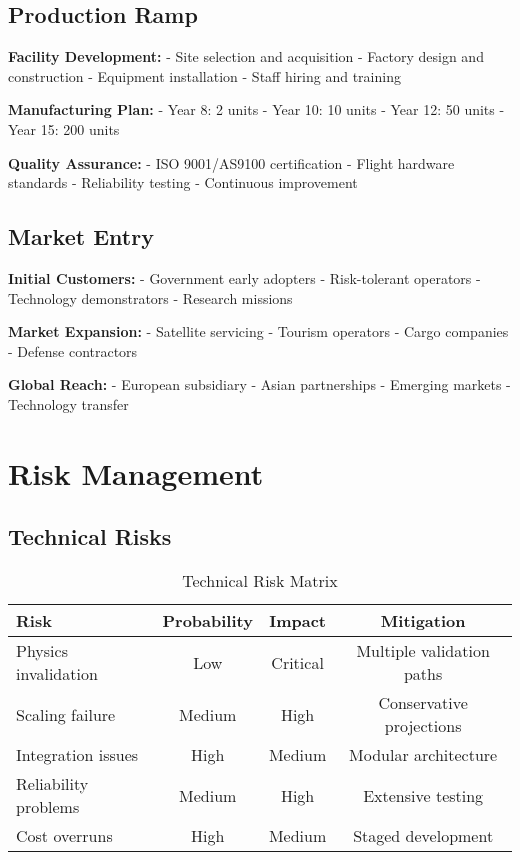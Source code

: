 \documentclass[12pt,letterpaper]{book}
\theoremstyle{definition}
\theoremstyle{plain}
\theoremstyle{remark}
\begin{document}
{{{{{\subsection{Production Ramp}

\textbf{Facility Development:}
- Site selection and acquisition
- Factory design and construction
- Equipment installation
- Staff hiring and training

\textbf{Manufacturing Plan:}
- Year 8: 2 units
- Year 10: 10 units
- Year 12: 50 units
- Year 15: 200 units

\textbf{Quality Assurance:}
- ISO 9001/AS9100 certification
- Flight hardware standards
- Reliability testing
- Continuous improvement

\subsection{Market Entry}

\textbf{Initial Customers:}
- Government early adopters
- Risk-tolerant operators
- Technology demonstrators
- Research missions

\textbf{Market Expansion:}
- Satellite servicing
- Tourism operators
- Cargo companies
- Defense contractors

\textbf{Global Reach:}
- European subsidiary
- Asian partnerships
- Emerging markets
- Technology transfer

\section{Risk Management}

\subsection{Technical Risks}

\begin{table}[h]
\centering
\caption{Technical Risk Matrix}
\begin{tabular}{lccc}
\toprule
Risk & Probability & Impact & Mitigation \\
\midrule
Physics invalidation & Low & Critical & Multiple validation paths \\
Scaling failure & Medium & High & Conservative projections \\
Integration issues & High & Medium & Modular architecture \\
Reliability problems & Medium & High & Extensive testing \\
Cost overruns & High & Medium & Staged development \\
\bottomrule
\end{tabular}
\end{table}

}}}}}
\end{document}
